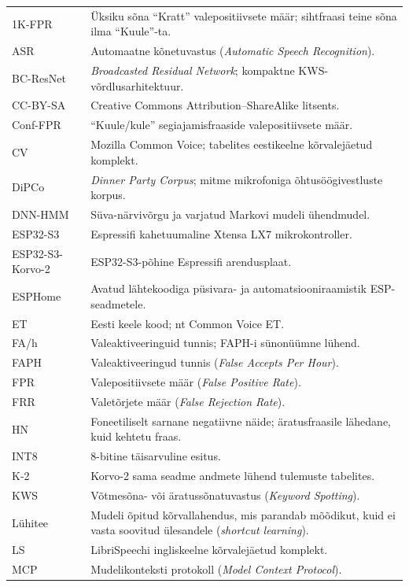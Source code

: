 \begin{longtable}{p{3.2cm}p{9.8cm}}
1K-FPR & Üksiku sõna \enquote{Kratt} valepositiivsete määr; sihtfraasi teine sõna ilma \enquote{Kuule}-ta.\\
ASR & Automaatne kõnetuvastus (\textit{Automatic Speech Recognition}).\\
BC-ResNet & \textit{Broadcasted Residual Network}; kompaktne KWS-võrdlusarhitektuur.\\
CC-BY-SA & Creative Commons Attribution--ShareAlike litsents.\\
Conf-FPR & \enquote{Kuule/kule} segiajamisfraaside valepositiivsete määr.\\
CV & Mozilla Common Voice; tabelites eestikeelne kõrvalejäetud komplekt.\\
DiPCo & \textit{Dinner Party Corpus}; mitme mikrofoniga õhtusöögivestluste korpus.\\
DNN-HMM & Süva-närvivõrgu ja varjatud Markovi mudeli ühendmudel.\\
ESP32-S3 & Espressifi kahetuumaline Xtensa LX7 mikrokontroller.\\
ESP32-S3-Korvo-2 & ESP32-S3-põhine Espressifi arendusplaat.\\
ESPHome & Avatud lähtekoodiga püsivara- ja automatsiooniraamistik ESP-seadmetele.\\
ET & Eesti keele kood; nt Common Voice ET.\\
FA/h & Valeaktiveeringuid tunnis; FAPH-i sünonüümne lühend.\\
FAPH & Valeaktiveeringud tunnis (\textit{False Accepts Per Hour}).\\
FPR & Valepositiivsete määr (\textit{False Positive Rate}).\\
FRR & Valetõrjete määr (\textit{False Rejection Rate}).\\
HN & Foneetiliselt sarnane negatiivne näide; äratusfraasile lähedane, kuid kehtetu fraas.\\
INT8 & 8-bitine täisarvuline esitus.\\
K-2 & Korvo-2 sama seadme andmete lühend tulemuste tabelites.\\
KWS & Võtmesõna- või äratussõnatuvastus (\textit{Keyword Spotting}).\\
Lühitee & Mudeli õpitud kõrvallahendus, mis parandab mõõdikut, kuid ei vasta soovitud ülesandele (\textit{shortcut learning}).\\
LS & LibriSpeechi ingliskeelne kõrvalejäetud komplekt.\\
MCP & Mudelikonteksti protokoll (\textit{Model Context Protocol}).\\

\end{longtable}
